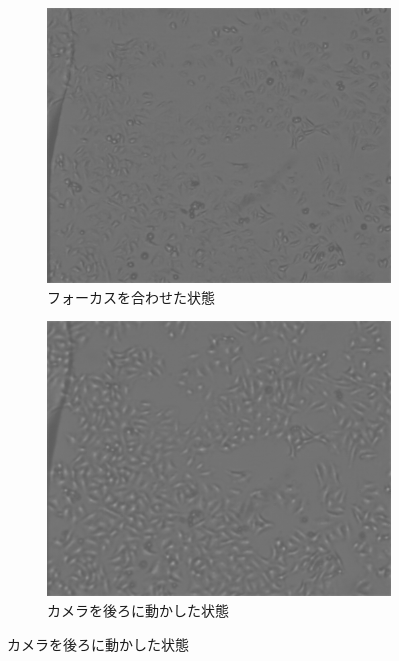 \documentclass[titlepage]{jsarticle}
\begin{document}
\begin{figure}[htbp]
    \centering
    \begin{subfigure}{0.3\columnwidth}
        \includegraphics[width=\columnwidth]{2_1_10mm_hela_edit.png}
        \caption{フォーカスを合わせた状態}
        \label{fig:2_1_hela}
    \end{subfigure}
    \begin{subfigure}{0.3\columnwidth}
        \includegraphics[width=\columnwidth]{2_2_10mm_hela_back_edit.png}
        \caption{カメラを後ろに動かした状態}
        \label{fig:2_2_hela}
    \end{subfigure}

\end{figure}
\end{document}
